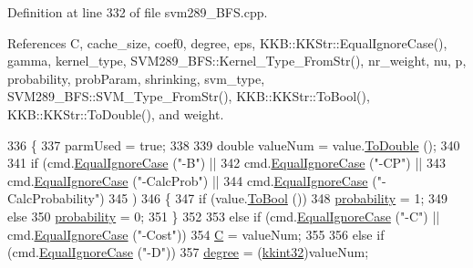 Definition at line 332 of file svm289\+\_\+\+B\+F\+S.\+cpp.



References C, cache\+\_\+size, coef0, degree, eps, K\+K\+B\+::\+K\+K\+Str\+::\+Equal\+Ignore\+Case(), gamma, kernel\+\_\+type, S\+V\+M289\+\_\+\+B\+F\+S\+::\+Kernel\+\_\+\+Type\+\_\+\+From\+Str(), nr\+\_\+weight, nu, p, probability, prob\+Param, shrinking, svm\+\_\+type, S\+V\+M289\+\_\+\+B\+F\+S\+::\+S\+V\+M\+\_\+\+Type\+\_\+\+From\+Str(), K\+K\+B\+::\+K\+K\+Str\+::\+To\+Bool(), K\+K\+B\+::\+K\+K\+Str\+::\+To\+Double(), and weight.


\begin{DoxyCode}
336 \{
337   parmUsed = \textcolor{keyword}{true};
338 
339   \textcolor{keywordtype}{double}  valueNum = value.\hyperlink{class_k_k_b_1_1_k_k_str_a95207190bd6a470ca0ef25ebea459c80}{ToDouble} ();
340 
341   \textcolor{keywordflow}{if}  (cmd.\hyperlink{class_k_k_b_1_1_k_k_str_a562f9696417c53f66bc4088eac072ab5}{EqualIgnoreCase} (\textcolor{stringliteral}{"-B"})         ||  
342        cmd.\hyperlink{class_k_k_b_1_1_k_k_str_a562f9696417c53f66bc4088eac072ab5}{EqualIgnoreCase} (\textcolor{stringliteral}{"-CP"})        ||
343        cmd.\hyperlink{class_k_k_b_1_1_k_k_str_a562f9696417c53f66bc4088eac072ab5}{EqualIgnoreCase} (\textcolor{stringliteral}{"-CalcProb"})  ||
344        cmd.\hyperlink{class_k_k_b_1_1_k_k_str_a562f9696417c53f66bc4088eac072ab5}{EqualIgnoreCase} (\textcolor{stringliteral}{"-CalcProbability"})
345       )
346   \{
347     \textcolor{keywordflow}{if}  (value.\hyperlink{class_k_k_b_1_1_k_k_str_a84e903540729b01cd2d712dc7050044a}{ToBool} ())
348       \hyperlink{struct_s_v_m289___b_f_s_1_1svm__parameter_acfe1c2e7915f38fd2c82cbf7403f6428}{probability} = 1;
349     \textcolor{keywordflow}{else}
350       \hyperlink{struct_s_v_m289___b_f_s_1_1svm__parameter_acfe1c2e7915f38fd2c82cbf7403f6428}{probability} = 0;
351   \}
352 
353   \textcolor{keywordflow}{else} \textcolor{keywordflow}{if}  (cmd.\hyperlink{class_k_k_b_1_1_k_k_str_a562f9696417c53f66bc4088eac072ab5}{EqualIgnoreCase} (\textcolor{stringliteral}{"-C"})  ||  cmd.\hyperlink{class_k_k_b_1_1_k_k_str_a562f9696417c53f66bc4088eac072ab5}{EqualIgnoreCase} (\textcolor{stringliteral}{"-Cost"}))
354     \hyperlink{struct_s_v_m289___b_f_s_1_1svm__parameter_a6e819bf58fb2b36b28cdf4abf22e3371}{C}  = valueNum;
355 
356   \textcolor{keywordflow}{else} \textcolor{keywordflow}{if}  (cmd.\hyperlink{class_k_k_b_1_1_k_k_str_a562f9696417c53f66bc4088eac072ab5}{EqualIgnoreCase} (\textcolor{stringliteral}{"-D"}))
357     \hyperlink{struct_s_v_m289___b_f_s_1_1svm__parameter_af2526e310e1a21859ad4aaa9de7bd6ce}{degree} = (\hyperlink{namespace_k_k_b_a8fa4952cc84fda1de4bec1fbdd8d5b1b}{kkint32})valueNum;

\end{DoxyCode}
